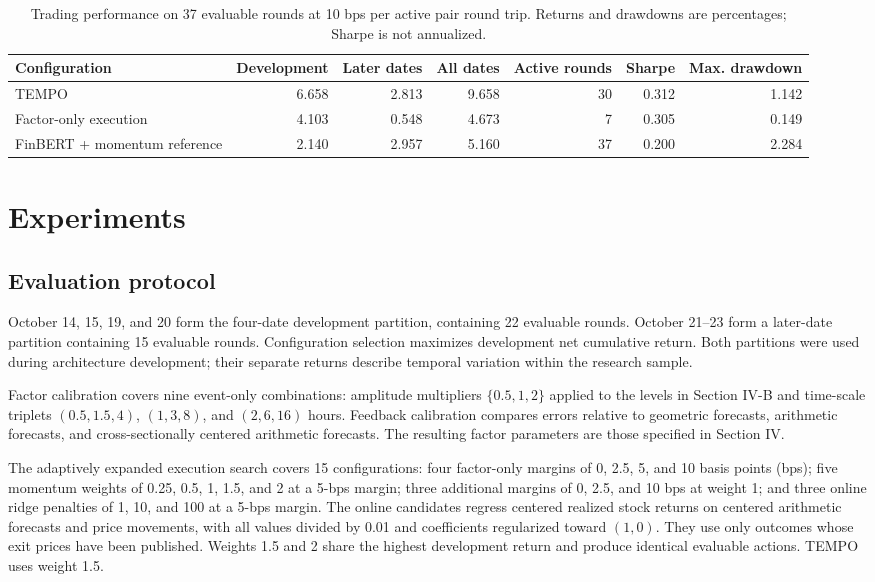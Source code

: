 \documentclass[conference]{IEEEtran}
\begin{document}
\begin{table}[!t]
\centering
\caption{Trading performance on 37 evaluable rounds at 10 bps per active pair round trip. Returns and drawdowns are percentages; Sharpe is not annualized.}
\label{tab:performance}
\begin{tabular}{lrrrrrr}
\toprule
Configuration & Development & Later dates & All dates & Active rounds & Sharpe & Max. drawdown\\
\midrule
TEMPO & 6.658 & 2.813 & 9.658 & 30 & 0.312 & 1.142\\
Factor-only execution & 4.103 & 0.548 & 4.673 & 7 & 0.305 & 0.149\\
FinBERT + momentum reference & 2.140 & 2.957 & 5.160 & 37 & 0.200 & 2.284\\
\bottomrule
\end{tabular}
\end{table}

\section{Experiments}
\subsection{Evaluation protocol}
October 14, 15, 19, and 20 form the four-date development partition, containing 22 evaluable rounds. October 21--23 form a later-date partition containing 15 evaluable rounds. Configuration selection maximizes development net cumulative return. Both partitions were used during architecture development; their separate returns describe temporal variation within the research sample.

Factor calibration covers nine event-only combinations: amplitude multipliers $\{0.5,1,2\}$ applied to the levels in Section IV-B and time-scale triplets $(0.5,1.5,4)$, $(1,3,8)$, and $(2,6,16)$ hours. Feedback calibration compares errors relative to geometric forecasts, arithmetic forecasts, and cross-sectionally centered arithmetic forecasts. The resulting factor parameters are those specified in Section IV.

The adaptively expanded execution search covers 15 configurations: four factor-only margins of 0, 2.5, 5, and 10 basis points (bps); five momentum weights of 0.25, 0.5, 1, 1.5, and 2 at a 5-bps margin; three additional margins of 0, 2.5, and 10 bps at weight 1; and three online ridge penalties of 1, 10, and 100 at a 5-bps margin. The online candidates regress centered realized stock returns on centered arithmetic forecasts and price movements, with all values divided by 0.01 and coefficients regularized toward $(1,0)$. They use only outcomes whose exit prices have been published. Weights 1.5 and 2 share the highest development return and produce identical evaluable actions. TEMPO uses weight 1.5.
\end{document}
